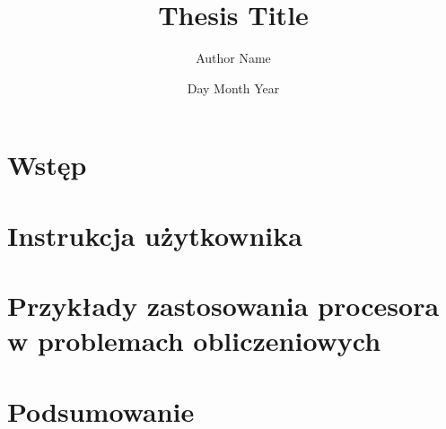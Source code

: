 \documentclass[12pt,twoside]{report}
\title{Thesis Title}
\author{Author Name}
\date{Day Month Year}
\begin{document}
	
	\tableofcontents	
	
	\chapter{Wstęp}
	
	
	\chapter{Instrukcja użytkownika}
    

    \chapter{Przykłady zastosowania procesora w problemach obliczeniowych}
    
    	
	\chapter{Podsumowanie}
	    	
    	
    

	
\end{document}
